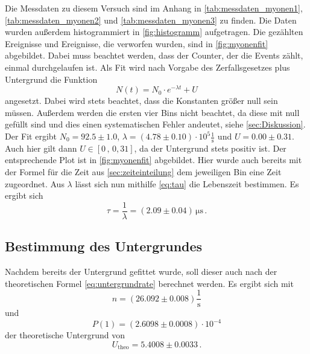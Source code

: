 Die Messdaten zu diesem Versuch sind im Anhang in \autoref{tab:messdaten_myonen1}, \autoref{tab:messdaten_myonen2} und \autoref{tab:messdaten_myonen3} zu finden.
Die Daten wurden außerdem histogrammiert in \autoref{fig:histogramm} aufgetragen.
Die gezählten Ereignisse und Ereignisse, die verworfen wurden, sind in \autoref{fig:myonenfit} abgebildet.
Dabei muss beachtet werden, dass der Counter, der die Events zählt, einmal durchgelaufen ist.
Als Fit wird nach Vorgabe des Zerfallsgesetzes plus Untergrund die Funktion
\begin{equation*}
    N(t) = N_0 \cdot e^{- \lambda t} + U
\end{equation*} 
angesetzt.
Dabei wird stets beachtet, dass die Konstanten größer null sein müssen.
Außerdem werden die ersten vier Bins nicht beachtet, da diese mit null gefüllt sind und dies einen systematischen Fehler andeutet, siehe \autoref{sec:Diskussion}.
Der Fit ergibt $N_0 = 92.5 \pm 1.0$, $\lambda = (4.78 \pm 0.10) \cdot 10^5 \frac{1}{\unit{\second}}$ und $U = 0.00 \pm 0.31$.
Auch hier gilt dann $U \in [0 \, , \, 0,31]$, da der Untergrund stets positiv ist.
Der entsprechende Plot ist in \autoref{fig:myonenfit} abgebildet.
Hier wurde auch bereits mit der Formel für die Zeit aus \autoref{sec:zeiteinteilung} dem jeweiligen Bin eine Zeit zugeordnet.
Aus $\lambda$ lässt sich nun mithilfe \autoref{eq:tau} die Lebenszeit bestimmen.
Es ergibt sich
\begin{equation}
    \tau = \frac{1}{\lambda} = (2.09\pm 0.04) \, \unit{\micro\second} \, .
\end{equation}

\subsection{Bestimmung des Untergrundes} \label{sec:untergrund_ausw}

Nachdem bereits der Untergrund gefittet wurde, soll dieser auch nach der theoretischen Formel \autoref{eq:untergrundrate} berechnet werden.
Es ergibt sich mit
\begin{equation*}
    n = (26.092\pm0.008) \frac{1}{\unit\second}
\end{equation*}
und
\begin{equation*}
    P(1) = (2.6098 \pm 0.0008) \cdot 10^{-4}
\end{equation*}
der theoretische Untergrund von
\begin{equation*}
    U_\text{theo} = 5.4008 \pm 0.0033 \, .
\end{equation*}